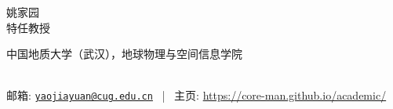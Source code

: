 \documentclass[11pt, a4paper]{article}
\makeatletter
\newcommand{\MyName}{姚家园}
\newcommand{\MyRole}{特任教授}
\newcommand{\Email}{yaojiayuan@cug.edu.cn}
\newcommand{\Website}{https://core-man.github.io/academic/}
\newcommand{\Affiliation}{
    中国地质大学（武汉），地球物理与空间信息学院
}
\newcommand{\Address}{
    Institute of Geophysics and Geomatics, 388 Lumo Road, Wuhan 430074, China
}
\newcommand{\makefield}[2]{\makebox[1.5em]{\color{MarkerColour!80!black}#1} #2}
\makeatother
\begin{document}
\thispagestyle{empty}

\begin{center}
    {\fontsize{30pt}{0}\selectfont \MyName}
    \\[0.5cm]
    {\fontsize{18pt}{0}\selectfont \MyRole}
    \\[0.3cm]
    {\fontsize{11pt}{0}\selectfont
        \Affiliation
        \\[0.08cm]
        邮箱: \href{mailto:\Email}{\texttt{\Email}}
        \, | \,
        主页: \url{\Website}
    }
\end{center}















%
%
\end{document}
